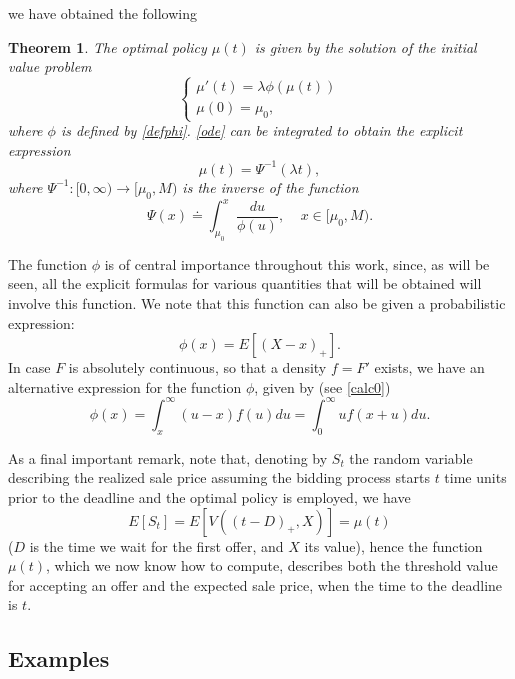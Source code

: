 \documentclass{article}
\newtheorem{thm}{Theorem}[section]
\numberwithin{equation}{section}
\begin{document}
we have obtained the following
\begin{thm}\label{optimal}
	The optimal policy $\mu(t)$ is given by the solution of the initial value problem
	\begin{equation}\label{ode}
		\begin{cases}
			\mu'(t)=\lambda \phi(\mu(t))\\
			\mu(0)=\mu_0,
		\end{cases}
	\end{equation}
	where $\phi$ is defined by \eqref{defphi}.
	\eqref{ode} can be integrated to obtain the 
	explicit expression
	\begin{equation}\label{ef}\mu(t)=\Psi^{-1}(\lambda t),\end{equation}
	where $\Psi^{-1}:[0,\infty)\rightarrow [\mu_0,M)$ is the inverse of the function
	\begin{equation}\label{def_Psi}\Psi(x)\doteq\int_{\mu_0}^x \frac{du}{\phi(u)},\;\;\;\; x\in [\mu_0,M).\end{equation}
\end{thm}
The function $\phi$ is of central importance throughout this work, since, as will be seen, all the explicit formulas for various quantities that will be obtained will involve this function.
We note that this function can also 
be given a probabilistic expression:
\begin{equation}\label{prob_phi}\phi(x)=E[(X-x)_+].\end{equation}
In case $F$ is absolutely continuous, so that a density $f=F'$ exists, we have an alternative expression for the function $\phi$, given by (see \eqref{calc0})
\begin{equation}\label{defphi1}
	\phi(x)=\int_x^\infty (u-x)f(u)du=\int_0^\infty uf(x+u)du.
\end{equation}

As a final important remark, note that, 
denoting by $S_t$ the random variable describing the realized sale price assuming the bidding process starts 
$t$ time units prior to the deadline and the optimal policy is employed, we have
\begin{equation}\label{Es}E[S_t]=E[V((t-D)_+,X)]=\mu(t)\end{equation}
($D$ is the time we wait for the first offer, and $X$ its value), hence the function $\mu(t)$, which we now know how to compute, describes both the threshold value for accepting an offer and the expected sale price, when the time to the deadline is $t$.

\subsection{Examples}
\label{mu_examples}
\end{document}
